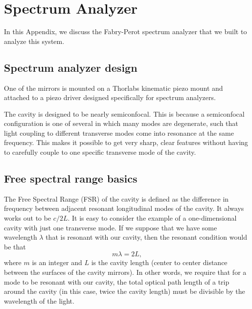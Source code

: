 \chapter{Spectrum Analyzer}
\label{SpectrumAnalyzerAppendix}

In this Appendix, we discuss the Fabry-Perot spectrum analyzer that we built to analyze this system. 

\section{Spectrum analyzer design}
One of the mirrors is mounted on a Thorlabs kinematic piezo mount and attached to a piezo driver designed specifically for spectrum analyzers.

The cavity is designed to be nearly semiconfocal.%
This is because a semiconfocal configuration is one of several in which many modes are degenerate, such that light coupling to different transverse modes come into resonance at the same frequency. This makes it possible to get very sharp, clear features without having to carefully couple to one specific transverse mode of the cavity. 


\section{Free spectral range basics}
The Free Spectral Range (FSR) of the cavity is defined as the difference in frequency between adjacent resonant longitudinal modes of the cavity. It always works out to be $c/2L$. 
It is easy to consider the example of a one-dimensional cavity with just one transverse mode. If we suppose that we have some wavelength $\lambda$ that is resonant with our cavity, then the resonant condition would be that 
\begin{equation}
m\lambda=2L,
\end{equation}
where $m$ is an integer and $L$ is the cavity length (center to center distance between the surfaces of the cavity mirrors). In other words, we require that for a mode to be resonant with our cavity, the total optical path length of a trip around the cavity (in this case, twice the cavity length) must be divisible by the wavelength of the light. 

